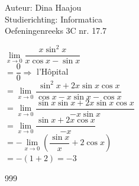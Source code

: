 \documentclass[a4paper]{article}
\begin{document}
\noindent \large Auteur: Dina Haajou \\
\noindent \large Studierichting: Informatica \\
\noindent \large Oefeningenreeks 3C nr. 17.7 \\

\medskip

\normalsize

$\lim\limits_{x \to 0} \dfrac{x \sin^2 x}{x \cos x - \sin x}$ \\

$= \dfrac{0}{0} \Rightarrow$ l’Hôpital \\

$= \lim\limits_{x \to 0} \dfrac{\sin^2 x + 2x \sin x \cos x}{\cos x - x \sin x - \cos x}$ \\

$= \lim\limits_{x \to 0} \dfrac{\sin x \sin x + 2x \sin x \cos x}{-x \sin x}$ \\

$= \lim\limits_{x \to 0} \dfrac{\sin x + 2x \cos x}{-x}$ \\

$= - \lim\limits_{x \to 0} \left( \dfrac{\sin x}{x} + 2 \cos x \right)$ \\

$= - (1 + 2) = -3$ \\

\begin{thebibliography}{999}
\end{thebibliography}
\end{document}
